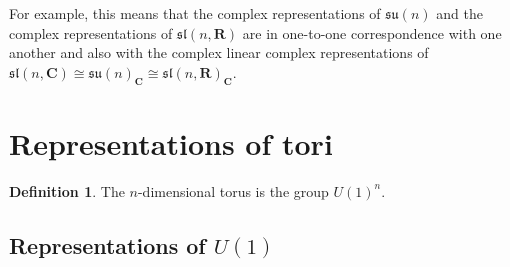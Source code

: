 \documentclass[12pt]{article}
\newcommand{\CC}{\mathbf{C}}
\newcommand{\RR}{\mathbf{R}}
\theoremstyle{definition}
\newtheorem{dfn}[thm]{Definition}
\theoremstyle{check}
\theoremstyle{remark}
\theoremstyle{TheoremNum}
\begin{document}
For example, this means that the complex representations of $\mathfrak{su}(n)$ and the complex representations of $\mathfrak{sl}(n,\RR)$ are in one-to-one correspondence with one another and also with the complex linear complex representations of $\mathfrak{sl}(n,\CC)\cong\mathfrak{su}(n)_{\CC}\cong\mathfrak{sl}(n,\RR)_{\CC}$.


\section{Representations of tori}

\begin{dfn}
The $n$-dimensional torus is the group $U(1)^n$.
\end{dfn}

\subsection{Representations of $U(1)$}
\end{document}
